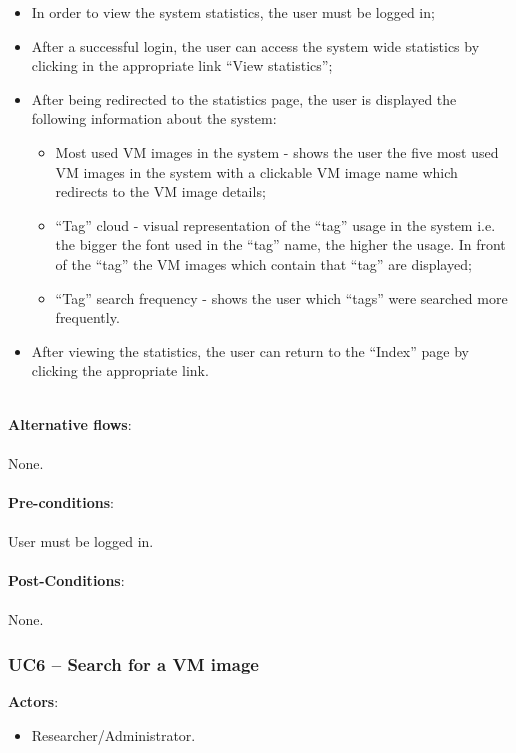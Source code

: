 \begin{itemize}
\item In order to view the system statistics, the user must be logged in;
\item After a successful login, the user can access the system wide statistics by clicking in the appropriate link ``View statistics'';
\item After being redirected to the statistics page, the user is displayed the following information about the system:
	\begin{itemize}
	\item Most used VM images in the system - shows the user the five most used VM images in the system with a clickable VM image name which redirects to the VM image details;
	\item ``Tag'' cloud - visual representation of the ``tag'' usage in the system i.e. the bigger the font used in the ``tag'' name, the higher the usage. In front of the ``tag'' the VM images which contain that ``tag'' are displayed;
	\item ``Tag'' search frequency - shows the user which ``tags'' were searched more frequently.
	\end{itemize}
\item After viewing the statistics, the user can return to the ``Index'' page by clicking the appropriate link.
\end{itemize}

\ \\
\textbf{Alternative flows}:\\
\ \\
None.\\
\ \\
\textbf{Pre-conditions}:\\
\ \\
User must be logged in.\\
\ \\
\textbf{Post-Conditions}:\\
\ \\
None.

\subsubsection{UC6 -- Search for a VM image}\label{uc6}

\textbf{Actors}:

\begin{itemize}
\item Researcher/Administrator.
\end{itemize}

